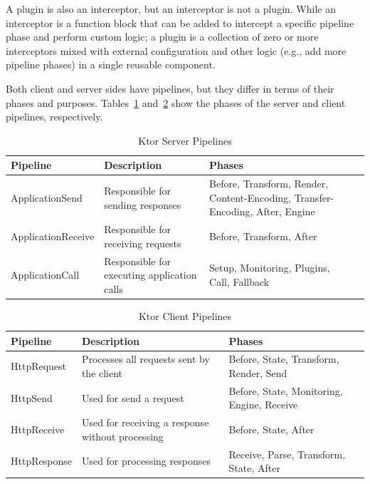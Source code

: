 A plugin is also an interceptor, but an interceptor is not a plugin.
While an interceptor is a function block that can be added to intercept a specific pipeline phase and perform custom logic; a plugin is a collection of zero or more interceptors mixed with external configuration and other logic (e.g., add more pipeline phases) in a single reusable component.

Both client and server sides have pipelines, but they differ in terms of their phases and purposes.
Tables~\ref{tab:ktor-server-pipelines} and~\ref{tab:ktor-client-pipelines} show the phases of the server and client pipelines, respectively.

\begin{table}[!htb]
    \centering
    \caption{Ktor Server Pipelines}
    \label{tab:ktor-server-pipelines}
    \vspace{0.3cm}
    \begin{tabular}{|l|p{6cm}|p{5cm}|p{5cm}|}
        \hline
        \textbf{Pipeline}  & \textbf{Description}                        & \textbf{Phases}                                                               \\ \hline
        ApplicationSend    & Responsible for sending responses           & Before, Transform, Render, Content-Encoding, Transfer-Encoding, After, Engine \\ \hline
        ApplicationReceive & Responsible for receiving requests          & Before, Transform, After                                                      \\ \hline
        ApplicationCall    & Responsible for executing application calls & Setup, Monitoring, Plugins, Call, Fallback                                    \\ \hline
    \end{tabular}
\end{table}

\begin{table}[!htb]
    \centering
    \caption{Ktor Client Pipelines}
    \label{tab:ktor-client-pipelines}
    \vspace{0.3cm}
    \begin{tabular}{|l|p{6cm}|p{5cm}|p{5cm}|}
        \hline
        \textbf{Pipeline} & \textbf{Description}                             & \textbf{Phases}                            \\ \hline
        HttpRequest       & Processes all requests sent by the client        & Before, State, Transform, Render, Send     \\ \hline
        HttpSend          & Used for send a request                          & Before, State, Monitoring, Engine, Receive \\ \hline
        HttpReceive       & Used for receiving a response without processing & Before, State, After                       \\ \hline
        HttpResponse      & Used for processing responses                    & Receive, Parse, Transform, State, After    \\ \hline
    \end{tabular}
\end{table}

